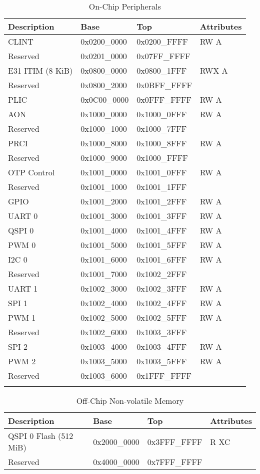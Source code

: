 \begin{longtable}[H]{| p{4.5cm} | p{3cm} | p{3cm} | p{2.5cm} |}
    \hline
    \textbf{Description} & \textbf{Base} & \textbf{Top} & \textbf{Attributes}\\
    \hline
    \hline
    \endfirsthead
    CLINT & 0x0200\_0000 & 0x0200\_FFFF & RW A\\
    Reserved & 0x0201\_0000 & 0x07FF\_FFFF & \\
    E31 ITIM (8 KiB) & 0x0800\_0000 & 0x0800\_1FFF & RWX A\\
    Reserved & 0x0800\_2000 & 0x0BFF\_FFFF & \\
    PLIC & 0x0C00\_0000 & 0x0FFF\_FFFF & RW A\\
    AON & 0x1000\_0000 & 0x1000\_0FFF & RW A\\
    Reserved & 0x1000\_1000 & 0x1000\_7FFF & \\
    PRCI & 0x1000\_8000 & 0x1000\_8FFF & RW A\\
    Reserved & 0x1000\_9000 & 0x1000\_FFFF & \\
    OTP Control & 0x1001\_0000 & 0x1001\_0FFF & RW A\\
    Reserved & 0x1001\_1000 & 0x1001\_1FFF & \\
    GPIO & 0x1001\_2000 & 0x1001\_2FFF & RW A\\
    UART 0 & 0x1001\_3000 & 0x1001\_3FFF & RW A\\
    QSPI 0 & 0x1001\_4000 & 0x1001\_4FFF & RW A\\
    PWM 0 & 0x1001\_5000 & 0x1001\_5FFF & RW A\\
    I2C 0 & 0x1001\_6000 & 0x1001\_6FFF & RW A\\
    Reserved & 0x1001\_7000 & 0x1002\_2FFF & \\
    UART 1 & 0x1002\_3000 & 0x1002\_3FFF & RW A\\
    SPI 1 & 0x1002\_4000 & 0x1002\_4FFF & RW A\\
    PWM 1 & 0x1002\_5000 & 0x1002\_5FFF & RW A\\
    Reserved & 0x1002\_6000 & 0x1003\_3FFF & \\
    SPI 2 & 0x1003\_4000 & 0x1003\_4FFF & RW A\\
    PWM 2 & 0x1003\_5000 & 0x1003\_5FFF & RW A\\
    Reserved & 0x1003\_6000 & 0x1FFF\_FFFF & \\
    \hline
    \caption{On-Chip Peripherals}
\end{longtable}

\begin{table}[H]
    \centering
    \begin{tabular}{| p{4.5cm} | p{3cm} | p{3cm} | p{2.5cm} |}
        \hline
        \textbf{Description} & \textbf{Base} & \textbf{Top} & \textbf{Attributes}\\
        \hline
        \hline
        QSPI 0 Flash (512 MiB) & 0x2000\_0000 & 0x3FFF\_FFFF & R XC\\
        Reserved & 0x4000\_0000 & 0x7FFF\_FFFF & \\
        \hline
    \end{tabular}
    \caption{Off-Chip Non-volatile Memory}
\end{table}

